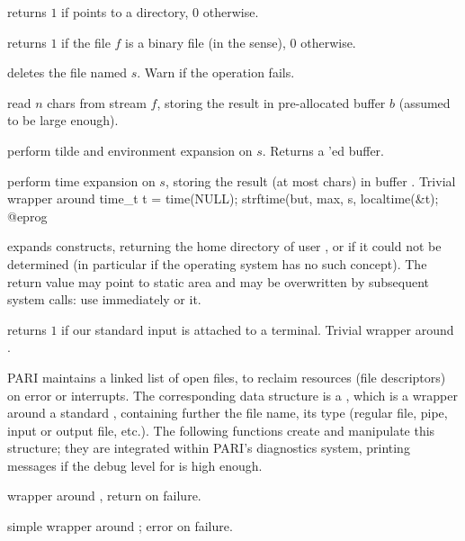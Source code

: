  returns $1$ if  points to
a directory, $0$ otherwise.

 returns $1$ if the file $f$ is a binary
file (in the  sense), $0$ otherwise.

 deletes the file named $s$. Warn
if the operation fails.

 read $n$ chars from
stream $f$, storing the result in pre-allocated buffer $b$ (assumed to be
large enough).

 perform tilde and environment expansion
on $s$. Returns a 'ed buffer.

 perform
time expansion on $s$, storing the result (at most  chars) in
buffer . Trivial wrapper around
\bprog
  time_t t = time(NULL);
  strftime(but, max, s, localtime(&t);
@eprog

 expands 
constructs, returning the home directory of user , or  if
it could not be determined (in particular if the operating system has no such
concept). The return value may point to static area and may be overwritten
by subsequent system calls: use immediately or  it.

 returns $1$ if our standard input
 is attached to a terminal. Trivial wrapper around .


PARI maintains a linked list of open files, to reclaim resources
(file descriptors) on error or interrupts. The corresponding data structure
is a , which is a wrapper around a standard ,
containing further the file name, its type (regular file, pipe, input or
output file, etc.). The following functions create and manipulate this
structure; they are integrated within PARI's diagnostics system, printing
messages if the debug level for  is high enough.

 wrapper
around , return  on failure.

simple wrapper around ; error on failure.

